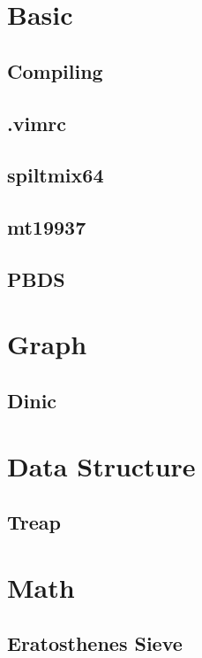 \documentclass[10pt,a4paper,twocolumn,oneside]{article}
\begin{document}
	\footnotesize
	\tableofcontents
	\setcounter{section}{-1}

	\section{Basic}
		\subsection{Compiling}
			
		\subsection{.vimrc}
			
		\subsection{spiltmix64}
			
		\subsection{mt19937}
			
		\subsection{PBDS}
			
	\section{Graph}
		\subsection{Dinic}
			
	
	\section{Data Structure}
		\subsection{Treap}
			

	\section{Math}
		\subsection{Eratosthenes Sieve}
			
\end{document}
